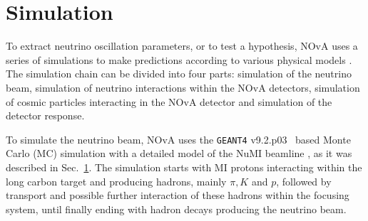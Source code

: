 \section{Simulation}\label{sec:NOvASimulation}


To extract neutrino oscillation parameters, or to test a hypothesis, NOvA uses a series of simulations to make predictions according to various physical models \cite{NOvASimulationOld-Fluka.pdf}.
The simulation chain can be divided into four parts: simulation of the neutrino beam, simulation of neutrino interactions within the NOvA detectors, simulation of cosmic particles interacting in the NOvA detector and simulation of the detector response.

To simulate the neutrino beam, NOvA uses the \texttt{GEANT4} v9.2.p03~\cite{GEANT4.pdf} based Monte Carlo (MC) simulation with a detailed model of the NuMI beamline \cite{ZPavlovicThesisG4NuMI_2008.pdf}, as it was described in Sec.~\ref{sec:NOvASimulation}. The simulation starts with MI protons interacting within the long carbon target and producing hadrons, mainly $\pi, K$ and $p$, followed by transport and possible further interaction of these hadrons within the focusing system, until finally ending with hadron decays producing the neutrino beam.

